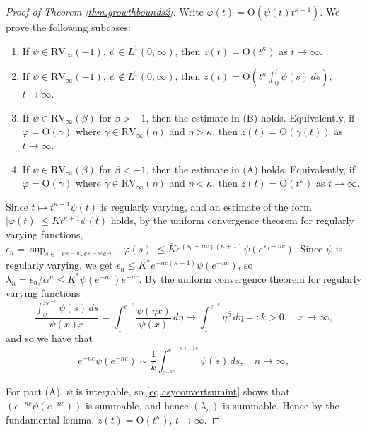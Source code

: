 \documentclass[a4paper,10pt,reqno]{amsart}
\numberwithin{equation}{section}
\theoremstyle{definition}
\theoremstyle{remark}
\DeclareMathOperator{\1}{\mathbbm 1}
\begin{document}
\begin{proof}[Proof of Theorem \ref{thm.growthbounds2}] 
Write $\varphi(t)=\text{O}(\psi(t)t^{\kappa+1})$. We prove the following subcases:
\begin{enumerate}
	\item[(A)] If $\psi\in \text{RV}_{\infty}(-1)$, $\psi\in L^1(0,\infty)$, then 
	$z(t)=\text{O}(t^\kappa)$ as $t\to\infty$.
	\item[(B)] If $\psi\in \text{RV}_{\infty}(-1)$, $\psi\not\in L^1(0,\infty)$, then 
	$	z(t)=\text{O}\left(t^\kappa\int_0^t \psi(s)\,ds\right)$, $t\to\infty$.
	\item[(C)] If  $\psi\in \text{RV}_{\infty}(\beta)$ for $\beta>-1$, then 
	the estimate in (B) holds. Equivalently, if $\varphi=\text{O}(\gamma)$ where $\gamma\in \text{RV}_\infty(\eta)$ and $\eta>\kappa$, then $z(t)=\text{O}(\gamma(t))$ as $t\to\infty$.
	\item[(D)] If  $\psi\in \text{RV}_{\infty}(\beta)$ for $\beta<-1$, then 
	the estimate in (A) holds. Equivalently, if $\varphi=\text{O}(\gamma)$ where $\gamma\in \text{RV}_\infty(\eta)$ and $\eta<\kappa$, then $z(t)=\text{O}(t^\kappa)$ as $t\to\infty$.  
\end{enumerate}	

Since $t\mapsto t^{\kappa+1}\psi(t)$ is regularly varying, and an estimate of the form $|\varphi(t)|\leq Kt^{\kappa+1}\psi(t)$ holds, by the uniform convergence theorem for regularly varying functions, $\epsilon_n = \sup_{s\in [e^{s_0-nc},e^{s_0-nc}e^{-c}]} |\varphi(s)|
\leq \bar{K} e^{(s_0-nc)(\kappa+1)} \psi(e^{s_0-nc})$. 
Since $\psi$ is regularly varying, we get  
$\epsilon_n\leq K^\ast  e^{-nc(\kappa+1)} \psi(e^{-nc})$, so $\lambda_n = \epsilon_n/\alpha^n \leq K^\ast \psi(e^{-nc}) e^{-nc}$. 
By the  uniform convergence theorem for regularly varying functions
\[
\frac{\int_x^{xe^{-c}} \psi(s)\,ds}{\psi(x)x} = \int_1^{e^{-c}} \frac{\psi(\eta x)}{\psi(x)}\,d\eta \to \int_1^{e^{-c}} \eta^\beta\,d\eta =: k>0, \quad x\to\infty,
\]
and so we have that 
\begin{equation} \label{eq.asyconvertsumint}
	e^{-nc} \psi(e^{-nc}) \sim \frac{1}{k} \int_{e^{-nc}}^{e^{-(n+1)c}} \psi(s)\,ds, \quad n\to\infty,
\end{equation}

For part (A), $\psi$ is integrable, so \eqref{eq.asyconvertsumint} shows that $(e^{-nc} \psi(e^{-nc}))$ is summable, and hence $(\lambda_n)$ is summable. Hence by the fundamental lemma, $z(t)=\text{O}(t^\kappa)$, $t\to\infty$. 


\end{proof}
\end{document}
